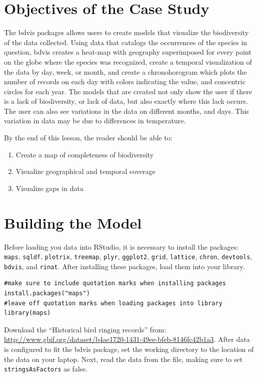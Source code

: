 \section{Objectives of the Case Study}

The bdvis packages allows users to create models that visualize the biodiversity of the data collected.
Using data that catalogs the occurrences of the species in question, bdvis creates a  heat-map with geography superimposed for every point on the globe where the species was recognized, create a temporal visualization of the data by day, week, or month, and create a chronohorogram which plots the number of records on each day with colors indicating the value, and concentric circles for each year.
The models that are created not only show the user if there is a lack of biodiversity, or lack of data, but also exactly where this lack occurs.
The user can also see variations in the data on different months, and days.
This variation in data may be due to differences in temperature.

By the end of this lesson, the reader should be able to:
\begin{enumerate}
\item Create a map of completeness of biodiversity
\item Visualize geographical and temporal coverage
\item Visualize gaps in data
\end{enumerate}

\section{Building the Model}

Before loading you data into RStudio, it is necessary to install the packages: \texttt{maps}, \texttt{sqldf}, \texttt{plotrix}, \texttt{treemap}, \texttt{plyr}, \texttt{ggplot2}, \texttt{grid}, \texttt{lattice}, \texttt{chron}, \texttt{devtools}, \texttt{bdvis}, and \texttt{rinat}.
After installing these packages, load them into your library.

\begin{lstlisting}
#make sure to include quotation marks when installing packages
install.packages("maps")
#leave off quotation marks when loading packages into library
library(maps)
\end{lstlisting}

Download the ``Historical bird ringing records'' from: \url{http://www.gbif.org/dataset/b4ae1720-1431-49ee-bfeb-8146fc42b1a3}.
After data is configured to fit the bdvis package, set the working directory to the location of the data on your laptop.
Next, read the data from the file, making sure to set \texttt{stringsAsFactors} as false.

